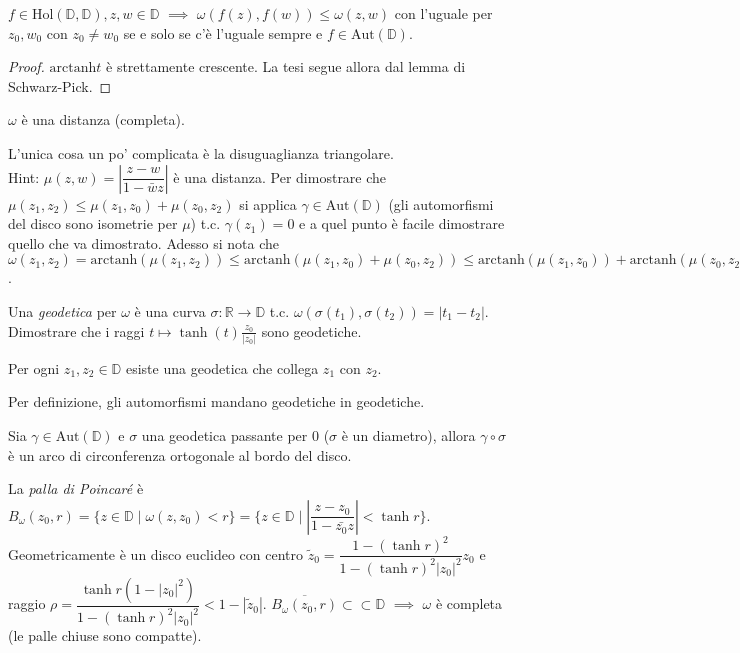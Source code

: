 \begin{cor}
  $f \in \text{Hol}(\mathbb{D}, \mathbb{D}), z, w \in \mathbb{D}$ $\implies$ $\omega(f(z), f(w)) \le \omega(z, w)$ con l'uguale per $z_0, w_0$ con $z_0 \not=w_0$ se e solo se c'è l'uguale sempre e $f \in \text{Aut}(\mathbb{D})$.
\end{cor}

\begin{proof}
  $\text{arctanh}t$ è strettamente crescente. La tesi segue allora dal lemma di Schwarz-Pick.
\end{proof}

\begin{exc}
  $\omega$ è una distanza (completa).
\end{exc}

\begin{sol}
  L'unica cosa un po' complicata è la disuguaglianza triangolare. \\
  Hint: $\mu(z, w)=\left|\dfrac{z-w}{1-\bar{w}z}\right|$ è una distanza. Per dimostrare che $\mu(z_1, z_2) \le \mu(z_1, z_0)+\mu(z_0, z_2)$ si applica $\gamma \in \text{Aut}(\mathbb{D})$ (gli automorfismi del disco sono isometrie per $\mu$) t.c. $\gamma(z_1)=0$ e a quel punto è facile dimostrare quello che va dimostrato.
  Adesso si nota che $\omega(z_1, z_2)=\text{arctanh}(\mu(z_1, z_2)) \le \text{arctanh}(\mu(z_1, z_0)+\mu(z_0, z_2)) \le \text{arctanh}(\mu(z_1, z_0))+\text{arctanh}(\mu(z_0, z_2))$.
\end{sol}

\begin{exc}
  Una \textit{geodetica} per $\omega$ è una curva $\sigma: \mathbb{R} \longrightarrow \mathbb{D}$ t.c. $\omega(\sigma(t_1), \sigma(t_2))=|t_1-t_2|$. Dimostrare che i raggi $t \longmapsto \tanh{(t)}\frac{z_0}{|z_0|}$ sono geodetiche.
\end{exc}

\begin{cor}
  Per ogni $z_1, z_2 \in \mathbb{D}$ esiste una geodetica che collega $z_1$ con $z_2$.
\end{cor}

Per definizione, gli automorfismi mandano geodetiche in geodetiche.

\begin{exc}
  Sia $\gamma \in \text{Aut}(\mathbb{D})$ e $\sigma$ una geodetica passante per $0$ ($\sigma$ è un diametro), allora $\gamma \circ \sigma$ è un arco di circonferenza ortogonale al bordo del disco.
\end{exc}

\begin{defn}
  La \textit{palla di Poincaré} è $B_{\omega}(z_0, r)=\{z \in \mathbb{D} \mid \omega(z, z_0)<r\}=\{z \in \mathbb{D} \mid \left|\dfrac{z-z_0}{1-\bar{z_0}z}\right|<\tanh{r}\}$.
  Geometricamente è un disco euclideo con centro $\tilde{z}_0=\dfrac{1-(\tanh{r})^2}{1-(\tanh{r})^2|z_0|^2}z_0$ e raggio $\rho=\dfrac{\tanh{r}(1-|z_0|^2)}{1-(\tanh{r})^2|z_0|^2}<1-|\tilde{z}_0|$.
  $\overline{B_{\omega}(z_0, r)} \subset \subset \mathbb{D}$ $\implies$ $\omega$ è completa (le palle chiuse sono compatte).
\end{defn}
